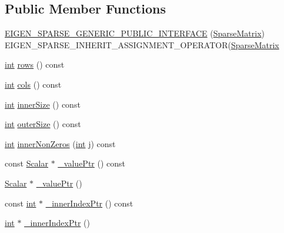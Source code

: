 \subsection*{Public Member Functions}
\begin{DoxyCompactItemize}
\item 
\hyperlink{class_sparse_matrix_a8be05ca0ba3a6a9223a626a1026646fe}{E\-I\-G\-E\-N\-\_\-\-S\-P\-A\-R\-S\-E\-\_\-\-G\-E\-N\-E\-R\-I\-C\-\_\-\-P\-U\-B\-L\-I\-C\-\_\-\-I\-N\-T\-E\-R\-F\-A\-C\-E} (\hyperlink{class_sparse_matrix}{Sparse\-Matrix}) E\-I\-G\-E\-N\-\_\-\-S\-P\-A\-R\-S\-E\-\_\-\-I\-N\-H\-E\-R\-I\-T\-\_\-\-A\-S\-S\-I\-G\-N\-M\-E\-N\-T\-\_\-\-O\-P\-E\-R\-A\-T\-O\-R(\hyperlink{class_sparse_matrix}{Sparse\-Matrix}
\item 
\hyperlink{ioapi_8h_a787fa3cf048117ba7123753c1e74fcd6}{int} \hyperlink{class_sparse_matrix_a54e7073b45d3569ab2a0e144e244c459}{rows} () const 
\item 
\hyperlink{ioapi_8h_a787fa3cf048117ba7123753c1e74fcd6}{int} \hyperlink{class_sparse_matrix_a6b7077709307ec5110dea0644a9930f8}{cols} () const 
\item 
\hyperlink{ioapi_8h_a787fa3cf048117ba7123753c1e74fcd6}{int} \hyperlink{class_sparse_matrix_a3b7c7c14ac2932c03e3a6a3e5cb42a82}{inner\-Size} () const 
\item 
\hyperlink{ioapi_8h_a787fa3cf048117ba7123753c1e74fcd6}{int} \hyperlink{class_sparse_matrix_ad8a7254b249bbaf78cc2c6d13a2cc7d8}{outer\-Size} () const 
\item 
\hyperlink{ioapi_8h_a787fa3cf048117ba7123753c1e74fcd6}{int} \hyperlink{class_sparse_matrix_ad4f8cb9658281d47f19ffb98f39d9710}{inner\-Non\-Zeros} (\hyperlink{ioapi_8h_a787fa3cf048117ba7123753c1e74fcd6}{int} j) const 
\item 
const \hyperlink{class_sparse_matrix_base_af39d70f2b7e775e9e17b666cd24128c8}{Scalar} $\ast$ \hyperlink{class_sparse_matrix_a0036d9822d2c0c44672c985f8f68ac44}{\-\_\-value\-Ptr} () const 
\item 
\hyperlink{class_sparse_matrix_base_af39d70f2b7e775e9e17b666cd24128c8}{Scalar} $\ast$ \hyperlink{class_sparse_matrix_ac284ee8f2a285bef389133b7188f2f58}{\-\_\-value\-Ptr} ()
\item 
const \hyperlink{ioapi_8h_a787fa3cf048117ba7123753c1e74fcd6}{int} $\ast$ \hyperlink{class_sparse_matrix_ad574d7f2a0fd9cbff2079a8cb452043b}{\-\_\-inner\-Index\-Ptr} () const 
\item 
\hyperlink{ioapi_8h_a787fa3cf048117ba7123753c1e74fcd6}{int} $\ast$ \hyperlink{class_sparse_matrix_a3dd09b00539c73d7dabe8aa730322e98}{\-\_\-inner\-Index\-Ptr} ()

\end{DoxyCompactItemize}
